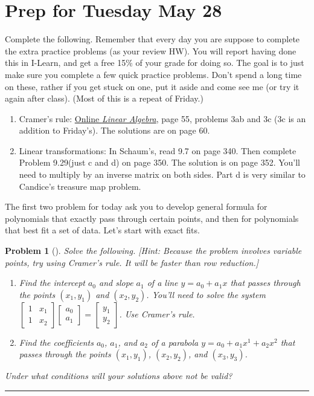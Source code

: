 \documentclass[letterpaper,oneside]{book}%
\newcommand{\onlinetext}{https://content.byui.edu/file/c2f91762-7a1e-4d0b-a1ae-8d5f5f548e17/1/341-Book.pdf}
\theoremstyle{plain}
\theoremstyle{box}
\theoremstyle{problem}
\newtheorem{problemnum}{Problem}[chapter]
\newtheorem*{hwenum*}{Home Work Practice}
\newenvironment{problem}[1][]{\begin{problemnum}[#1]}{\end{problemnum}\nopagebreak\hrule\bigskip}
\newenvironment{hw*}[1][]{\begin{hwenum*}[#1]}{\end{hwenum*}\nopagebreak\hrule\bigskip}
\newcommand{\bvec}[1]{\begin{bmatrix} #1 \end{bmatrix}}
\begin{document}
\section{Prep for Tuesday May 28}
\begin{hw*}
 Complete the following.  Remember that every day you are suppose to complete the extra practice problems (as your review HW).  You will report having done this in I-Learn, and get a free 15\% of your grade for doing so. The goal is to just make sure you complete a few quick practice problems. Don't spend a long time on these, rather if you get stuck on one, put it aside and come see me (or try it again after class). (Most of this is a repeat of Friday.)
 \begin{enumerate}
  \item Cramer's rule: \href{\onlinetext}{Online {\it Linear Algebra}}, page 55, problems 3ab and 3c (3c is an addition to Friday's). The solutions are on page 60.
  \item Linear transformations: In Schaum's, read 9.7 on page 340. Then complete Problem 9.29(just c and d) on page 350.  The solution is on page 352. You'll need to multiply by an inverse matrix on both sides. Part d is very similar to Candice's treasure map problem.
 \end{enumerate}
 
\end{hw*}


The first two problem for today ask you to develop general formula for polynomials that exactly pass through certain points, and then for polynomials that best fit a set of data. Let's start with exact fits. 

\begin{problem}
Solve the following. [Hint: Because the problem involves variable points, try using Cramer's rule. It will be faster than row reduction.]
\begin{enumerate}
 \item Find the intercept $a_0$ and slope $a_1$ of a line $y = a_0+a_1 x$ that passes through the points $(x_1,y_1)$ and $(x_2,y_2)$. You'll need to solve the system $\bvec{1&x_1\\1&x_2}\bvec{a_0\\a_1}=\bvec{y_1\\y_2}$. Use Cramer's rule. 
 \item Find the coefficients $a_0$, $a_1$, and $a_2$ of a parabola $y = a_0+a_1 x^1+a_2x^2$ that passes through the points $(x_1, y_1)$,  $(x_2, y_2)$, and  $(x_3, y_3)$.
\end{enumerate}
Under what conditions will your solutions above not be valid?
\end{problem}
\end{document}
